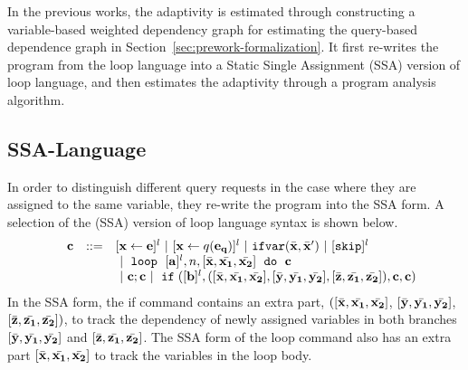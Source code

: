 In the previous works, the adaptivity is estimated
through constructing a variable-based weighted dependency graph for
estimating the query-based dependence graph in Section~\ref{sec:prework-formalization}.
It first re-writes the program from the loop language into
a Static Single Assignment (SSA) version of loop language, and then estimates the adaptivity through a program analysis algorithm.
\subsection{SSA-Language}
In order to distinguish different query requests in the case where they are assigned to
the same variable, they re-write the program into the SSA form.
A selection of the (SSA) version of loop language syntax is shown below.
\[
\begin{array}{llll}
 & \ssa{c} & ::= & [\assign {\ssa{x}}{ \ssa{\expr}}]^{l} ~|~ [\assign {{\ssa{x}} } {q({\ssa{e_q}})}]^{l}
%
~|~ {{\eifvar(\bar{\ssa{x}}, \bar{\ssa{x}}')}} ~|~ [\eskip]^{l} 
\\ &&&
~|~
 \eloop ~ [{\ssa{\aexpr}}]^{l}, {n}, [\bar{\ssa{x}}, \bar{\ssa{x_1}}, \bar{\ssa{x_2}}] ~ \edo ~ {\ssa{c}}
 \\ &&& ~|~  \ssa{c};\ssa{c} ~|~ \eif([\ssa{\bexpr}]^{l}, ([\bar{\ssa{x}}, \bar{\ssa{x_1}}, \bar{\ssa{x_2}}] , [\bar{\ssa{y}}, \bar{\ssa{y_1}}, \bar{\ssa{y_2}}],[\bar{\ssa{z}}, \bar{\ssa{z_1}}, \bar{\ssa{z_2}}] ) , \ssa{c}, \ssa{c}) 
\end{array}
\]
In the SSA form, the if command contains an extra part,
 $([\bar{{\bf{{x}}}}, \bar{{\bf{{x_1}}}}, \bar{{\bf{{x_2}}}}]$, $
[\bar{{\bf{{y}}}}, \bar{{\bf{{y_1}}}}, \bar{{\bf{{y_2}}}}]$, $[\bar{{\bf{{z}}}}, \bar{{\bf{{z_1}}}}, \bar{{\bf{{z_2}}}}] )$,
to track the dependency of newly assigned variables in both branches
$[\bar{{\bf{{y}}}}, \bar{{\bf{{y_1}}}}, \bar{{\bf{{y_2}}}}]$ and  $[\bar{{\bf{{z}}}}, \bar{{\bf{{z_1}}}}, \bar{{\bf{{z_2}}}}] $. 
The SSA form of the loop command also has an extra part $ [\bar{{\bf{{x}}}}, \bar{{\bf{{x_1}}}}, \bar{{\bf{{x_2}}}}]$ 
to track the variables in the loop body.


